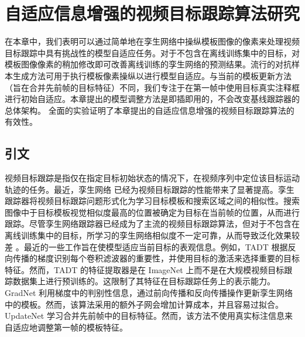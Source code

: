 \chapter{自适应信息增强的视频目标跟踪算法研究}\label{chap:MTP}
在本章中，我们表明可以通过简单地在孪生网络中操纵模板图像的像素来处理视频目标跟踪中具有挑战性的模型自适应任务。对于不包含在离线训练集中的目标，对模板图像像素的稍加修改即可改善离线训练的孪生网络的预测结果。流行的对抗样本生成方法可用于执行模板像素操纵以进行模型自适应。与当前的模板更新方法（旨在合并先前帧的目标特征）不同，我们专注于在第一帧中使用目标真实注释框进行初始自适应。本章提出的模型调整方法是即插即用的，不会改变基线跟踪器的总体架构。
全面的实验证明了本章提出的自适应信息增强的视频目标跟踪算法的有效性。

\section{引文}
视频目标跟踪是指仅在指定目标初始状态的情况下，在视频序列中定位该目标运动轨迹的任务。最近，孪生网络 \cite{danelljan2019atom, SiamFC} 已经为视频目标跟踪的性能带来了显著提高。孪生跟踪器将视频目标跟踪问题形式化为学习目标模板和搜索区域之间的相似性。搜索图像中于目标模板视觉相似度最高的位置被确定为目标在当前帧的位置，从而进行跟踪。尽管孪生网络跟踪器已经成为了主流的视频目标跟踪算法，但对于不包含在离线训练集中的目标，所学习的孪生网络相似度不一定可靠，从而导致泛化效果较差 \cite{Bhat_2019_ICCV}。最近的一些工作旨在使模型适应当前目标的表观信息。例如，TADT \cite{Li_2019_CVPR} 根据反向传播的梯度识别每个卷积滤波器的重要性，并使用目标的激活来选择重要的目标特征。然而，TADT 的特征提取器是在 ImageNet \cite{VID} 上而不是在大规模视频目标跟踪数据集上进行预训练的。这限制了其特征在目标跟踪任务上的表示能力。GradNet \cite{Li_2019_ICCV} 利用梯度中的判别性信息，通过前向传播和反向传播操作更新孪生网络中的模板。然而，该算法采用的额外子网会增加计算成本，并且容易过拟合。UpdateNet \cite{Zhang_2019_ICCV} 学习合并先前帧中的目标特征。然而，该方法不使用真实标注信息来自适应地调整第一帧的模板特征。

